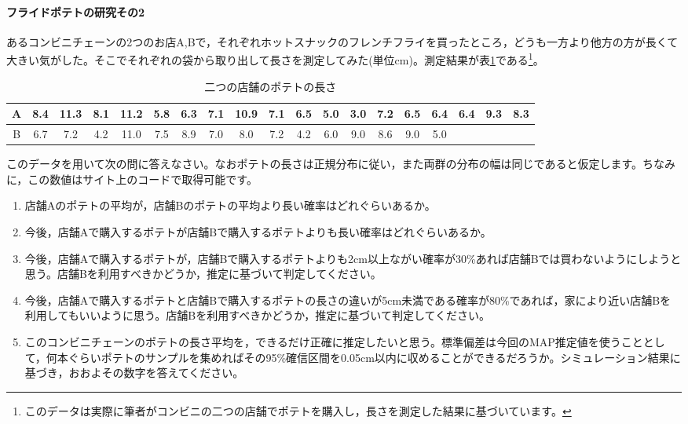 \documentclass{ltjsbook}
\begin{document}
\paragraph{フライドポテトの研究その2}
あるコンビニチェーンの2つのお店A,Bで，それぞれホットスナックのフレンチフライを買ったところ，どうも一方より他方の方が長くて大きい気がした。そこでそれぞれの袋から取り出して長さを測定してみた(単位cm)。測定結果が表\ref{tab::20_01}である\footnote{このデータは実際に筆者がコンビニの二つの店舗でポテトを購入し，長さを測定した結果に基づいています。}。
\begin{table}[ht]
    \center
    \caption{二つの店舗のポテトの長さ}
\begin{tabular}{c|cccccccccccccccccc}\hline
    A & 8.4 & 11.3 & 8.1 & 11.2 & 5.8 & 6.3 & 7.1 & 10.9 & 7.1 & 6.5 & 5.0 & 3.0 & 7.2 & 6.5 & 6.4 & 6.4 & 9.3 & 8.3 \\\hline
    B & 6.7 & 7.2 & 4.2 & 11.0 & 7.5 & 8.9 & 7.0 & 8.0 & 7.2 & 4.2 & 6.0 & 9.0 & 8.6 & 9.0 & 5.0 &  &  &  \\\hline
\end{tabular}
\label{tab::20_01}
\end{table}
このデータを用いて次の問に答えなさい。なおポテトの長さは正規分布に従い，また両群の分布の幅は同じであると仮定します。ちなみに，この数値はサイト上のコードで取得可能です。
\begin{enumerate}
    \item 店舗Aのポテトの平均が，店舗Bのポテトの平均より長い確率はどれぐらいあるか。
    \item 今後，店舗Aで購入するポテトが店舗Bで購入するポテトよりも長い確率はどれぐらいあるか。
    \item 今後，店舗Aで購入するポテトが，店舗Bで購入するポテトよりも2cm以上ながい確率が30\%あれば店舗Bでは買わないようにしようと思う。店舗Bを利用すべきかどうか，推定に基づいて判定してください。
    \item 今後，店舗Aで購入するポテトと店舗Bで購入するポテトの長さの違いが5cm未満である確率が80\%であれば，家により近い店舗Bを利用してもいいように思う。店舗Bを利用すべきかどうか，推定に基づいて判定してください。
    \item このコンビニチェーンのポテトの長さ平均を，できるだけ正確に推定したいと思う。標準偏差は今回のMAP推定値を使うこととして，何本ぐらいポテトのサンプルを集めればその95\%確信区間を0.05cm以内に収めることができるだろうか。シミュレーション結果に基づき，おおよその数字を答えてください。
\end{enumerate}
\end{document}
